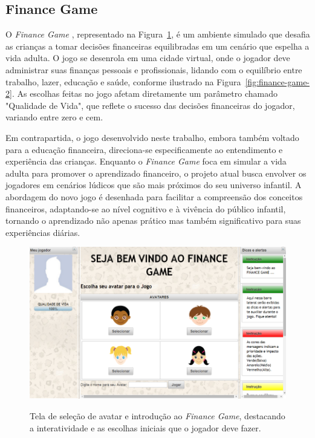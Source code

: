 \newpage

\subsection{Finance Game}
\label{subsec:finance-game}

O \textit{Finance Game} \cite{Finance_Game}, representado na Figura~\ref{fig:finance-game-1}, é um ambiente simulado que desafia as crianças a tomar decisões financeiras equilibradas em um cenário que espelha a vida adulta. O jogo se desenrola em uma cidade virtual, onde o jogador deve administrar suas finanças pessoais e profissionais, lidando com o equilíbrio entre trabalho, lazer, educação e saúde, conforme ilustrado na Figura~\ref{fig:finance-game-2}. As escolhas feitas no jogo afetam diretamente um parâmetro chamado "Qualidade de Vida", que reflete o sucesso das decisões financeiras do jogador, variando entre zero e cem.

Em contrapartida, o jogo desenvolvido neste trabalho, embora também voltado para a educação financeira, direciona-se especificamente ao entendimento e experiência das crianças. Enquanto o \textit{Finance Game} foca em simular a vida adulta para promover o aprendizado financeiro, o projeto atual busca envolver os jogadores em cenários lúdicos que são mais próximos do seu universo infantil. A abordagem do novo jogo é desenhada para facilitar a compreensão dos conceitos financeiros, adaptando-se ao nível cognitivo e à vivência do público infantil, tornando o aprendizado não apenas prático mas também significativo para suas experiências diárias.

\begin{figure}[ht]
	\centering
	\caption{Tela de seleção de avatar e introdução ao \textit{Finance Game}, destacando a interatividade e as escolhas iniciais que o jogador deve fazer.}
	\includegraphics[scale=0.46]{Textuais/Pictures/Finance-game-1.png}
	\label{fig:finance-game-1}
\end{figure}


